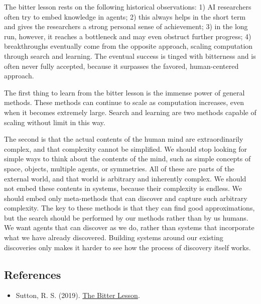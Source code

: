 The bitter lesson rests on the following historical observations: 1) AI researchers often try to embed knowledge in agents; 2) this always helps in the short term and gives the researchers a strong personal sense of achievement; 3) in the long run, however, it reaches a bottleneck and may even obstruct further progress; 4) breakthroughs eventually come from the opposite approach, scaling computation through search and learning. The eventual success is tinged with bitterness and is often never fully accepted, because it surpasses the favored, human-centered approach.

The first thing to learn from the bitter lesson is the immense power of general methods. These methods can continue to scale as computation increases, even when it becomes extremely large. Search and learning are two methods capable of scaling without limit in this way.

The second is that the actual contents of the human mind are extraordinarily complex, and that complexity cannot be simplified. We should stop looking for simple ways to think about the contents of the mind, such as simple concepts of space, objects, multiple agents, or symmetries. All of these are parts of the external world, and that world is arbitrary and inherently complex. We should not embed these contents in systems, because their complexity is endless. We should embed only meta-methods that can discover and capture such arbitrary complexity. The key to these methods is that they can find good approximations, but the search should be performed by our methods rather than by us humans. We want agents that can discover as we do, rather than systems that incorporate what we have already discovered. Building systems around our existing discoveries only makes it harder to see how the process of discovery itself works.

\FloatBarrier
{}
\hypertarget{references-5}{%
\subsection{References}\label{references-5}}

\vspace{0.25em}
\begin{itemize}
\tightlist
\item
  Sutton, R. S. (2019). \href{http://www.incompleteideas.net/IncIdeas/BitterLesson.html}{The Bitter Lesson}.
\end{itemize}

\clearpage
